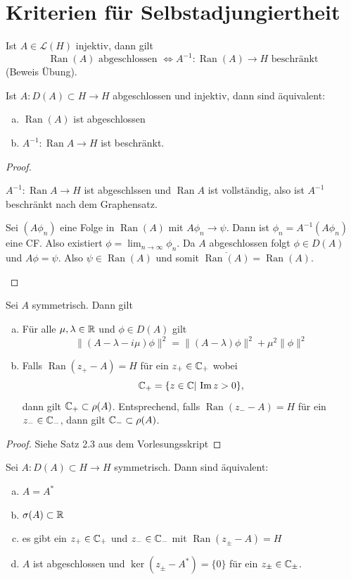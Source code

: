 \documentclass{mycourse}
\newcommand{\Ran}{\operatorname{Ran}}
\begin{document}
\chapter{Kriterien für Selbstadjungiertheit}\label{3}
Ist $A\in \mathcal L(H)$ injektiv, dann gilt
\[
\Ran(A) \text{ abgeschlossen } \iff A^{-1}: \Ran(A) \to H \text{ beschränkt}
\]
(Beweis Übung).
\begin{lem}
Ist $A: D(A) \subset H \to H$ abgeschlossen und injektiv, dann sind äquivalent:
\begin{enumerate}[a)]
\item $\Ran(A)$ ist abgeschlossen
\item $A^{-1}: \Ran A \to H$ ist beschränkt.
\end{enumerate}
\end{lem}
\begin{proof}
\begin{seg}[(a) $\implies$ (b)] 
$A^{-1}: \Ran A \to H$ ist abgeschlssen und $\Ran A$ ist vollständig, also ist $A^{-1}$ beschränkt nach dem Graphensatz. 
\end{seg}
\begin{seg}[(b) $\implies$ (a)]
Sei $(A\phi_n)$ eine Folge in $\Ran(A)$ mit $A\phi_n \to \psi$. Dann ist $\phi_n = A^{-1}(A\phi_n)$ eine CF. Also existiert $\phi = \lim_{n\to \infty} \phi_n$. Da $A$ abgeschlossen folgt $\phi \in D(A)$ und $A\phi =  \psi$. Also $\psi \in \Ran(A)$ und somit $\overline{\Ran(A)}=\Ran(A)$.
\end{seg}
\end{proof}
\begin{st}
Sei $A$ symmetrisch. Dann gilt 
\begin{enumerate}[a)]
\item Für alle $\mu, \lambda\in \mathbb{R}$ und $\phi \in D(A)$ gilt
\[
\| (A-\lambda-i \mu) \phi \|^2 = \| (A-\lambda) \phi\|^2 + \mu^2 \| \phi\|^2
\]
\item Falls $\Ran(z_+-A)=H$ für ein $z_+ \in \mathbb{C}_+$ wobei
\[
\mathbb{C}_+ = \{z\in \mathbb{C} | \, \operatorname{Im} z > 0 \},
\]
dann gilt $\mathbb{C}_+\subset \rho(A)$. Entsprechend, falls $\Ran(z_- -A) =H$ für ein $z_- \in \mathbb{C}_-$, dann gilt $\mathbb{C}_-\subset \rho(A)$.
\end{enumerate}
\end{st}
\begin{proof}
Siehe Satz 2.3 aus dem Vorlesungsskript
\end{proof}
\begin{st}\label{3.3}
Sei $A: D(A)\subset H \to H$ symmetrisch. Dann sind äquivalent:
\begin{enumerate}[a)]
\item $A=A^*$
\item $\sigma(A)\subset \mathbb{R}$
\item es gibt ein $z_+\in \mathbb{C}_+$ und $z_-\in \mathbb{C}_-$ mit $\Ran(z_\pm-A)=H$
\item $A$ ist abgeschlossen und $\ker(z_\pm- A^*) =\{0\}$ für ein $z_\pm\in \mathbb{C}_\pm$.
\end{enumerate}
\end{st}
\end{document}
